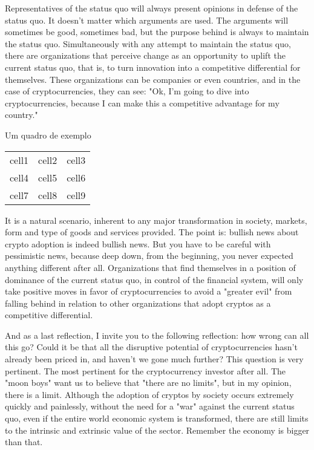 Representatives of the status quo will always present opinions in defense of the status quo. It doesn't matter which arguments are used. The arguments will sometimes be good, sometimes bad, but the purpose behind is always to maintain the status quo. Simultaneously with any attempt to maintain the status quo, there are organizations that perceive change as an opportunity to uplift the current status quo, that is, to turn innovation into a competitive differential for themselves. These organizations can be companies or even countries, and in the case of cryptocurrencies, they can see: "Ok, I'm going to dive into cryptocurrencies, because I can make this a competitive advantage for my country."

\begin{landscape}
  \begin{quadro}[!hbt]
    \caption{Um quadro de exemplo}
    \begin{center}
      \begin{tabular}{ |c|c|c| }
        \hline
        cell1 & cell2 & cell3 \\
        cell4 & cell5 & cell6 \\
        cell7 & cell8 & cell9 \\
        \hline
      \end{tabular}
    \end{center}
    \label{quadro-exemplo}
  \end{quadro}
\end{landscape}

It is a natural scenario, inherent to any major transformation in society, markets, form and type of goods and services provided. The point is: bullish news about crypto adoption is indeed bullish news. But you have to be careful with pessimistic news, because deep down, from the beginning, you never expected anything different after all. Organizations that find themselves in a position of dominance of the current status quo, in control of the financial system, will only take positive moves in favor of cryptocurrencies to avoid a "greater evil" from falling behind in relation to other organizations that adopt cryptos as a competitive differential.

And as a last reflection, I invite you to the following reflection: how wrong can all this go? Could it be that all the disruptive potential of cryptocurrencies hasn't already been priced in, and haven't we gone much further? This question is very pertinent. The most pertinent for the cryptocurrency investor after all. The "moon boys" want us to believe that "there are no limits", but in my opinion, there is a limit. Although the adoption of cryptos by society occurs extremely quickly and painlessly, without the need for a "war" against the current status quo, even if the entire world economic system is transformed, there are still limits to the intrinsic and extrinsic value of the sector. Remember the economy is bigger than that.

